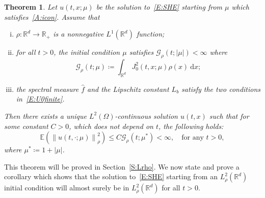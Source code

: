 \documentclass[sn-mathphys]{sn-jnl}%
\newcommand{\BR}{\mathbb{R}}
\newcommand{\E}{\mathbb{E}}
\newcommand{\Norm}[1]{\left\| #1 \right\|}
\newcommand{\ud}{\ensuremath{\mathrm{d}}}
\numberwithin{equation}{section}
\theoremstyle{thmstyleone}%
\newtheorem{theorem}{Theorem}[section]%
\theoremstyle{thmstyletwo}%
\theoremstyle{thmstylethree}%
\begin{document}
\begin{theorem}\label{T:Lrho}
  Let $u(t,x;\mu)$ be the solution to~\eqref{E:SHE} starting from $\mu$ which
  satisfies~\eqref{A:icon}. Assume that
  \begin{enumerate}[(i)]
    \item $\rho: \BR^d \to \BR_+$ is a nonnegative $L^1 (\BR^d)$ function;
    \item for all $t > 0$, the initial condition $\mu$ satisfies $\mathcal{G}_{\rho}(t;\lvert\mu\rvert) <
      \infty$ where
      \begin{equation}\label{E:G}
        \mathcal{G}_{\rho}(t;\mu)
        \coloneqq \int_{\BR^d} J_0^2\left(t,x;\mu\right) \rho(x)\: \ud x;
      \end{equation}
    \item the spectral measure $\widehat{f}$ and the Lipschitz constant $L_b$ satisfy the two
      conditions in~\eqref{E:U0finite}.
  \end{enumerate}
  Then there exists a unique $L^2 (\Omega)$-continuous solution $u(t,x)$ such that for some constant
  $C>0$, which does not depend on $t$, the following holds:
  \begin{equation}\label{E:uInLrho}
    \E\left(\Norm{u(t,\cdot; \mu)}_{\rho}^2\right)
    \le C \mathcal{G}_{\rho}(t; \mu^*)
    < \infty, \quad \text{for any $t > 0$},
  \end{equation}
  where $ \mu^* \coloneqq 1 + \lvert\mu\rvert$.
\end{theorem}

This theorem will be proved in Section~\ref{S:Lrho}. We now state and prove a corollary which shows
that the solution to~\eqref{E:SHE} starting from an $L^2_{\rho}(\BR^d)$ initial condition will almost
surely be in $L^2_{\rho}(\BR^d)$ for all $t >0$.
\end{document}
